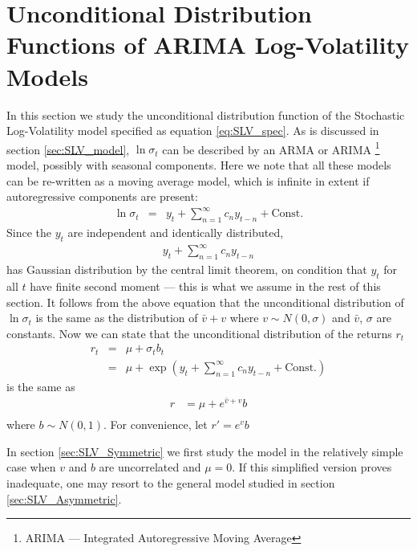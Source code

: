 \section{Unconditional Distribution Functions of ARIMA Log-Volatility
  Models}\label{sec:XieCalc}
In this section we study the unconditional distribution function of
the Stochastic Log-Volatility model specified as equation
\ref{eq:SLV_spec}. As is discussed in section \ref{sec:SLV_model},
$\ln\sigma_t$ can be described by an ARMA or ARIMA \footnote{ARIMA ---
  Integrated Autoregressive Moving Average} model, possibly with
seasonal components. Here we note that all these models can be
re-written as a moving average model, which is infinite in extent if
autoregressive components are present:
\begin{eqnarray*}
  \ln \sigma_t &=& y_t + \sum_{n=1}^\infty c_n y_{t-n} + \text{Const.}
\end{eqnarray*}
Since the $y_t$ are independent and identically distributed,
\begin{eqnarray*}
  y_t + \sum_{n=1}^\infty c_n y_{t-n}  
\end{eqnarray*}
has Gaussian distribution by the central limit theorem, on condition
that $y_t$ for all $t$ have finite second moment --- this is what we
assume in the rest of this section. It follows from the above equation
that the unconditional distribution of $\ln \sigma_t$ is the same as the
distribution of $\bar{v} + v$ where $v \sim N(0, \sigma)$ and
$\bar{v}$, $\sigma$ are constants. Now we can state that the
unconditional distribution of the returns $r_t$
\begin{eqnarray*}
  r_t &=& \mu + \sigma_t b_t\\
  &=& \mu + \exp\left(
    y_t + \sum_{n=1}^\infty c_n y_{t-n} + \text{Const.}
  \right)
\end{eqnarray*}
 is the same as
\begin{equation}  \label{eq:UnconditionalPdf}
  \begin{aligned}
    r &= \mu + e^{\bar{v} + v} b \\
  \end{aligned}
\end{equation}
where $b \sim N(0, 1)$. For convenience, let $r' = e^v b$

In section \ref{sec:SLV_Symmetric} we first study the model in the
relatively simple case when $v$ and $b$ are uncorrelated and $\mu
= 0$. If this simplified version proves inadequate, one may resort to
the general model studied in section \ref{sec:SLV_Asymmetric}.

